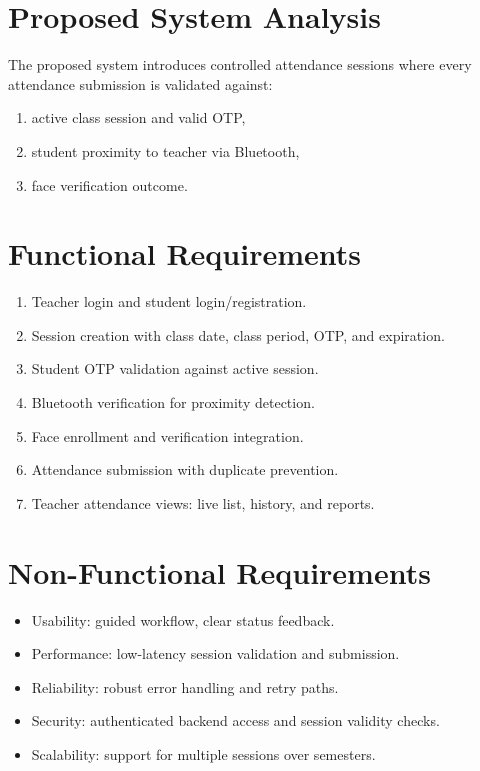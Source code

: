 \documentclass[12pt,a4paper]{report}
\begin{document}
\section{Proposed System Analysis}
The proposed system introduces controlled attendance sessions where every attendance submission is validated against:
\begin{enumerate}[leftmargin=1.5cm]
\item active class session and valid OTP,
\item student proximity to teacher via Bluetooth,
\item face verification outcome.
\end{enumerate}

\section{Functional Requirements}
\begin{enumerate}[leftmargin=1.5cm]
\item Teacher login and student login/registration.
\item Session creation with class date, class period, OTP, and expiration.
\item Student OTP validation against active session.
\item Bluetooth verification for proximity detection.
\item Face enrollment and verification integration.
\item Attendance submission with duplicate prevention.
\item Teacher attendance views: live list, history, and reports.
\end{enumerate}

\section{Non-Functional Requirements}
\begin{itemize}[leftmargin=1.5cm]
\item Usability: guided workflow, clear status feedback.
\item Performance: low-latency session validation and submission.
\item Reliability: robust error handling and retry paths.
\item Security: authenticated backend access and session validity checks.
\item Scalability: support for multiple sessions over semesters.
\end{itemize}
\end{document}
